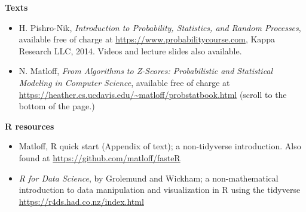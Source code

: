 {\bf Texts}
\begin{itemize}
	\item
H. Pishro-Nik, {\it Introduction to Probability, Statistics, and Random Processes}, available free of charge at \url{https://www.probabilitycourse.com}, Kappa Research LLC, 2014. Videos and lecture slides also available.
\item 
N. Matloff, {\it From Algorithms to Z-Scores: Probabilistic and Statistical Modeling in Computer Science}, available free of charge at \url{https://heather.cs.ucdavis.edu/~matloff/probstatbook.html} (scroll to the bottom of the page.)
\end{itemize}

{\bf R resources}
\begin{itemize}
\item 	Matloff,  R quick start (Appendix of text); a non-tidyverse introduction. Also found at \url{https://github.com/matloff/fasteR}
\item {\it R for Data Science}, by Grolemund and Wickham; a non-mathematical introduction to data manipulation and visualization in R using the tidyverse \url{https://r4ds.had.co.nz/index.html}
\end{itemize}









 
